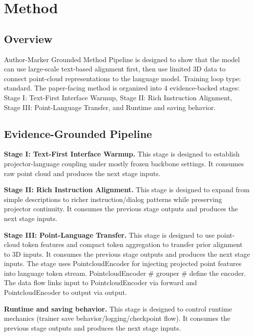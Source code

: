 \section{Method}

\subsection{Overview}
Author-Marker Grounded Method Pipeline is designed to show that the model can use large-scale text-based alignment first, then use limited 3D data to connect point-cloud representations to the language model. Training loop type: standard. The paper-facing method is organized into 4 evidence-backed stages: Stage I: Text-First Interface Warmup, Stage II: Rich Instruction Alignment, Stage III: Point-Language Transfer, and Runtime and saving behavior.

\subsection{Evidence-Grounded Pipeline}
\textbf{Stage I: Text-First Interface Warmup.} This stage is designed to establish projector-language coupling under mostly frozen backbone settings. It consumes raw point cloud and produces the next stage inputs.

\textbf{Stage II: Rich Instruction Alignment.} This stage is designed to expand from simple descriptions to richer instruction/dialog patterns while preserving projector continuity. It consumes the previous stage outputs and produces the next stage inputs.

\textbf{Stage III: Point-Language Transfer.} This stage is designed to use point-cloud token features and compact token aggregation to transfer prior alignment to 3D inputs. It consumes the previous stage outputs and produces the next stage inputs. The stage uses PointcloudEncoder for injecting projected point features into language token stream. PointcloudEncoder \# grouper \# define the encoder. The data flow links input to PointcloudEncoder via forward and PointcloudEncoder to output via output.

\textbf{Runtime and saving behavior.} This stage is designed to control runtime mechanics (trainer save behavior/logging/checkpoint flow). It consumes the previous stage outputs and produces the next stage inputs.

